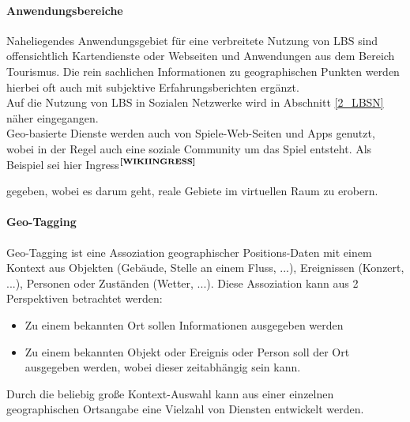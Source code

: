 \paragraph{Anwendungsbereiche}\label{sec:GL:GEOTAG}
Naheliegendes Anwendungsgebiet für eine verbreitete Nutzung von LBS sind offensichtlich Kartendienste oder Webseiten und Anwendungen aus dem Bereich Tourismus. Die rein sachlichen Informationen zu geographischen Punkten werden hierbei oft auch mit subjektive Erfahrungsberichten ergänzt.\\
Auf die Nutzung von LBS in Sozialen Netzwerke wird in Abschnitt \ref{2_LBSN} näher eingegangen.\\
Geo-basierte Dienste werden auch von Spiele-Web-Seiten und Apps genutzt, wobei in der Regel auch eine soziale Community um das Spiel entsteht. Als Beispiel sei hier Ingress$^{\textbf{\ref{WIKIINGRESS}}}$%
\addtocounter{footnote}{1}%
gegeben, wobei es darum geht, reale Gebiete im virtuellen Raum zu erobern.

\paragraph{Geo-Tagging}\label{sec:GL:GEOTAG}
Geo-Tagging ist eine Assoziation geographischer Positions-Daten mit einem Kontext aus Objekten (Gebäude, Stelle an einem Fluss, ...), Ereignissen (Konzert, ...), Personen oder Zuständen (Wetter, ...). Diese Assoziation kann aus 2 Perspektiven betrachtet werden:
\begin{itemize}[leftmargin=*,noitemsep,topsep=1ex,parsep=0pt,partopsep=0pt]
\item Zu einem bekannten Ort sollen Informationen ausgegeben werden
\item Zu einem bekannten Objekt oder Ereignis oder Person soll der Ort ausgegeben werden, wobei dieser zeitabhängig sein kann.
\end{itemize}
Durch die beliebig große Kontext-Auswahl kann aus einer einzelnen geographischen Ortsangabe eine Vielzahl von Diensten entwickelt werden.


